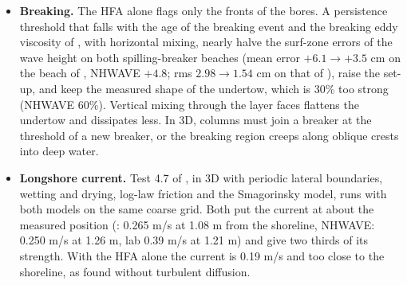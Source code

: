 \begin{itemize}[nosep]
        but the implicit free surface needs a limiter on the outflows (which
        keeps the volume conserved, unlike NHWAVE's clip), and the collocated
        mesh needs the upwind (TVD) depth at the side faces and the upwind
        predicted flux in supercritical flow. With the centred depth of the
        mesh faces the fronts were too slow ($R/d = 0.41$ for the solitary
        wave); with both changes the run-up is 0.531 (NHWAVE 0.512, lab
        0.49--0.55), still water stays at rest on a beach, and the
        parabolic basin is reproduced to 0.9 mm rms. A dam break on a dry
        bed showed that both models treat the film as a wet bed and follow
        Stoker's solution for it, not Ritter's. Parallel runs give the same
        run-up with a processor boundary in the swash zone (0.540 against
        0.531).
  \item \textbf{Breaking.} The HFA alone flags only the fronts of the
        bores. A persistence threshold that falls with the age of the
        breaking event and the breaking eddy viscosity of
        \citet{kennedy2000}, with horizontal mixing, nearly halve the
        surf-zone errors of the wave height on both spilling-breaker beaches (mean
        error $+6.1 \to +3.5$ cm on the beach of \citet{ting1994}, NHWAVE
        $+4.8$; rms $2.98 \to 1.54$ cm on that of \citet{hansen1979}), raise
        the set-up, and keep the measured shape of the undertow, which is
        30\% too strong (NHWAVE 60\%). Vertical mixing through the layer
        faces flattens the undertow and dissipates less. In 3D, columns
        must join a breaker at the threshold of a new breaker, or the
        breaking region creeps along oblique crests into deep water.
  \item \textbf{Longshore current.} Test 4.7 of \citet{ma2012}, in 3D
        with periodic lateral boundaries, wetting and drying, log-law
        friction and the Smagorinsky model, runs with both models on the
        same coarse grid. Both put the current at about the measured
        position (\NHFOAM: 0.265 m/s at 1.08 m from the shoreline, NHWAVE:
        0.250 m/s at 1.26 m, lab 0.39 m/s at 1.21 m) and give two thirds of
        its strength. With the HFA alone the current is 0.19 m/s and too
        close to the shoreline, as \citet{ma2012} found without turbulent
        diffusion.
\end{itemize}

